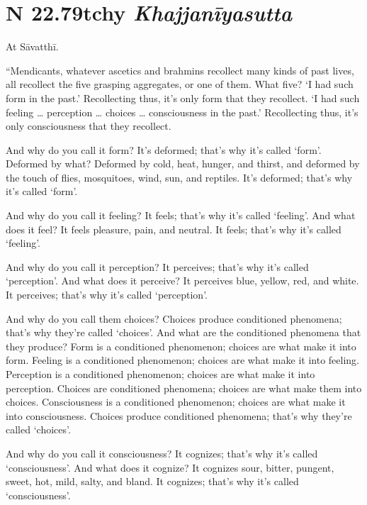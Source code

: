 \documentclass[12pt,openany]{book}%
\newcommand*{\suttatitleacronym}[1]{\smaller[2]{#1}\vspace*{.3em}}
\newcommand*{\suttatitletranslation}[1]{\linebreak{#1}}
\newcommand*{\suttatitleroot}[1]{\linebreak\smaller[2]\itshape{#1}}
\newcommand*{\tocacronym}[1]{\hspace*{-3.3em}{#1}\quad}
\newcommand*{\toctranslation}[1]{#1}
\newcommand*{\tocroot}[1]{(\textit{#1})}
\begin{document}
%
\section*{{\suttatitleacronym SN 22.79}{\suttatitletranslation Itchy }{\suttatitleroot Khajjanīyasutta}}
\addcontentsline{toc}{section}{\tocacronym{SN 22.79} \toctranslation{Itchy } \tocroot{Khajjanīyasutta}}

At \textsanskrit{Sāvatthī}. 

“Mendicants, whatever ascetics and brahmins recollect many kinds of past lives, all recollect the five grasping aggregates, or one of them. What five? ‘I had such form in the past.’ Recollecting thus, it’s only form that they recollect. ‘I had such feeling … perception … choices … consciousness in the past.’ Recollecting thus, it’s only consciousness that they recollect. 

And why do you call it form? It’s deformed; that’s why it’s called ‘form’. Deformed by what? Deformed by cold, heat, hunger, and thirst, and deformed by the touch of flies, mosquitoes, wind, sun, and reptiles. It’s deformed; that’s why it’s called ‘form’. 

And why do you call it feeling? It feels; that’s why it’s called ‘feeling’. And what does it feel? It feels pleasure, pain, and neutral. It feels; that’s why it’s called ‘feeling’. 

And why do you call it perception? It perceives; that’s why it’s called ‘perception’. And what does it perceive? It perceives blue, yellow, red, and white. It perceives; that’s why it’s called ‘perception’. 

And why do you call them choices? Choices produce conditioned phenomena; that’s why they’re called ‘choices’. And what are the conditioned phenomena that they produce? Form is a conditioned phenomenon; choices are what make it into form. Feeling is a conditioned phenomenon; choices are what make it into feeling. Perception is a conditioned phenomenon; choices are what make it into perception. Choices are conditioned phenomena; choices are what make them into choices. Consciousness is a conditioned phenomenon; choices are what make it into consciousness. Choices produce conditioned phenomena; that’s why they’re called ‘choices’. 

And why do you call it consciousness? It cognizes; that’s why it’s called ‘consciousness’. And what does it cognize? It cognizes sour, bitter, pungent, sweet, hot, mild, salty, and bland. It cognizes; that’s why it’s called ‘consciousness’. 
\end{document}
